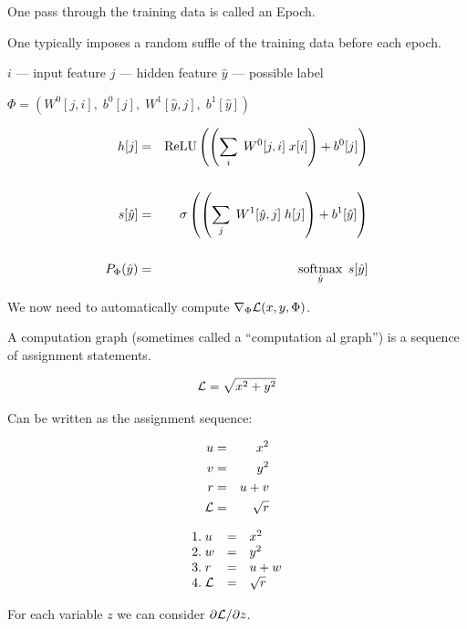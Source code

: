 {\vfill
One pass through the training data is called an Epoch.

\vfill
One typically imposes a random suffle of the training data before each epoch.


\centerline{$i$ --- input feature \hspace{4ex} $j$ --- hidden feature \hspace{4ex} $\hat{y}$ --- possible label}
\vfill
\centerline{$\Phi = (W^0[j,i],\;b^0[j],\;W^1[\hat{y},j],\;b^1[\hat{y}])$}

\vfill
\begin{eqnarray*}
  h[j] & = & \mathrm{ReLU}\left(\left(\sum_i\;W^0[j,i] \;x[i]\right) + b^0[j]\right) \\
  \\
  s[\hat{y}] & = & \sigma\left(\left(\sum_j\;W^1[\hat{y},j]\;h[j]\right) + b^1[\hat{y}]\right) \\
  \\
  P_\Phi(\hat{y}) & = & \operatorname*{softmax}_{\hat{y}}\;s[\hat{y}]
\end{eqnarray*}

\vfill
We now need to automatically compute $\nabla_\Phi {\cal L}(x,y,\Phi)$.


A computation graph (sometimes called a ``computation{\color{red} al} graph'') is a sequence of assignment statements.

\vfill
$${\cal L} = \sqrt{x^2 + y^2}$$

\vfill
Can be written as the assignment sequence:

\vfill
\begin{eqnarray*}
  u & = & x^2  \\
  v & = & y^2 \\
  r & =& u + v \\
  {\cal L} & = & \sqrt{r}
\end{eqnarray*}

\vspace{-1ex}
$$\begin{array}{lcl}
 1.\;u & = & x^2  \\
 2.\;w & = & y^2 \\
 3.\;r & =& u + w \\
  4.\;{\cal L} & = & \sqrt{r}
\end{array}$$

\vfill
For each variable $z$ we can consider $\partial {\cal L}/\partial z$.

}
